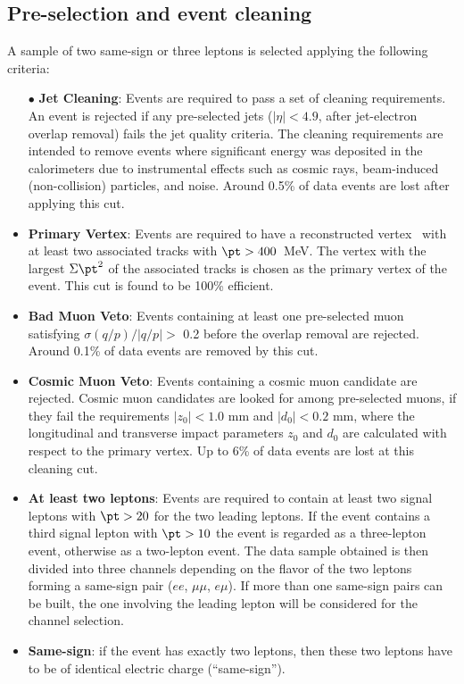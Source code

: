 \subsection{Pre-selection and event cleaning}
\label{subsec:sec.strategy.selection_cleaning}

A sample of two same-sign or three leptons is selected applying the following criteria:
\begin{itemize}
\item[$\bullet$] \textbf{Jet Cleaning}: 
Events are required to pass a set of cleaning requirements. 
An event is rejected if any pre-selected jets ($|\eta|<4.9$, after 
jet-electron overlap removal) fails the jet quality criteria. 
The cleaning requirements are intended to remove events where significant 
energy was deposited in the calorimeters 
due to instrumental effects such as cosmic rays, beam-induced (non-collision) 
particles, and noise. Around 0.5\% of data events are lost after applying 
this cut.

\item \textbf{Primary Vertex}:
Events are required to have a reconstructed vertex~\cite{ATL-PHYS-PUB-2015-026} 
with at least two associated tracks with $\pt >400$~MeV. The vertex with the largest $\Sigma \pt^2$ of the associated tracks 
is chosen as the primary vertex of the event.
This cut is found to be 100\% efficient.

\item \textbf{Bad Muon Veto}: 
Events containing at least one pre-selected muon satisfying $\sigma(q/p)/|q/p| >$ 0.2 before the overlap removal are rejected. 
Around 0.1\% of data events are removed by this cut.

\item \textbf{Cosmic Muon Veto}: 
Events containing a cosmic muon candidate are rejected. 
Cosmic muon candidates are looked for among pre-selected muons, 
if they fail the requirements $|z_0| <1.0$ mm and $|d_0|<0.2$ mm, 
where the longitudinal and transverse impact parameters $z_0$ and $d_0$ 
are calculated with respect to the primary vertex. 
Up to 6\% of data events are lost at this cleaning cut.

\item \textbf{At least two leptons}: 
Events are required to contain at least two signal leptons 
with $\pt>20$ \GeV for the two leading leptons. 
If the event contains a third signal lepton with $\pt>10$ \GeV the event is regarded as a three-lepton event, otherwise as a two-lepton event. 
The data sample obtained is then divided into three channels depending on the flavor of the two  leptons forming a same-sign pair ($ee$, $\mu\mu$, $e\mu$). 
If more than one same-sign pairs can be built, the one involving the leading 
lepton will be considered for the channel selection. 

\item \textbf{Same-sign}: 
if the event has exactly two leptons, then these two leptons
 have to be of identical electric charge (``same-sign'').
\end{itemize}


